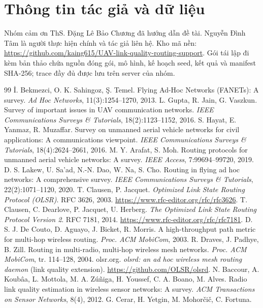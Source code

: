 \documentclass[11pt,a4paper]{article}
\begin{document}
\section*{Thông tin tác giả và dữ liệu}
Nhóm cảm ơn ThS. Đặng Lê Bảo Chương đã hướng dẫn đề tài.
Nguyễn Đình Tâm là người thực hiện chính và tác giả liên hệ.
Kho mã nền: \url{https://github.com/kaing615/UAV-link-quality-routing-support}.
Gói tái lập đi kèm bản thảo chứa nguồn đóng gói, mô hình, kế hoạch seed,
kết quả và manifest SHA-256; trace đầy đủ được lưu trên server của nhóm.
\begin{thebibliography}{99}
 İ. Bekmezci, O. K. Sahingoz, Ş. Temel.
Flying Ad-Hoc Networks (FANETs): A survey.
\textit{Ad Hoc Networks}, 11(3):1254--1270, 2013.
 L. Gupta, R. Jain, G. Vaszkun.
Survey of important issues in UAV communication networks.
\textit{IEEE Communications Surveys \& Tutorials}, 18(2):1123--1152, 2016.
 S. Hayat, E. Yanmaz, R. Muzaffar.
Survey on unmanned aerial vehicle networks for civil applications:
A communications viewpoint.
\textit{IEEE Communications Surveys \& Tutorials}, 18(4):2624--2661, 2016.
 M. Y. Arafat, S. Moh.
Routing protocols for unmanned aerial vehicle networks: A survey.
\textit{IEEE Access}, 7:99694--99720, 2019.
 D. S. Lakew, U. Sa'ad, N.-N. Dao, W. Na, S. Cho.
Routing in flying ad hoc networks: A comprehensive survey.
\textit{IEEE Communications Surveys \& Tutorials}, 22(2):1071--1120, 2020.
 T. Clausen, P. Jacquet.
\textit{Optimized Link State Routing Protocol (OLSR)}. RFC 3626, 2003.
\url{https://www.rfc-editor.org/rfc/rfc3626}.
 T. Clausen, C. Dearlove, P. Jacquet, U. Herberg.
\textit{The Optimized Link State Routing Protocol Version 2}. RFC 7181, 2014.
\url{https://www.rfc-editor.org/rfc/rfc7181}.
 D. S. J. De Couto, D. Aguayo, J. Bicket, R. Morris.
A high-throughput path metric for multi-hop wireless routing.
\textit{Proc. ACM MobiCom}, 2003.
 R. Draves, J. Padhye, B. Zill.
Routing in multi-radio, multi-hop wireless mesh networks.
\textit{Proc. ACM MobiCom}, tr. 114--128, 2004.
 olsr.org. \textit{olsrd: an ad hoc wireless mesh routing
daemon} (link quality extension). \url{https://github.com/OLSR/olsrd}.
 N. Baccour, A. Koubâa, L. Mottola, M. A. Zúñiga, H. Youssef,
C. A. Boano, M. Alves. Radio link quality estimation in wireless sensor
networks: A survey. \textit{ACM Transactions on Sensor Networks}, 8(4), 2012.
 G. Cerar, H. Yetgin, M. Mohorčič, C. Fortuna.

\end{thebibliography}
\end{document}
